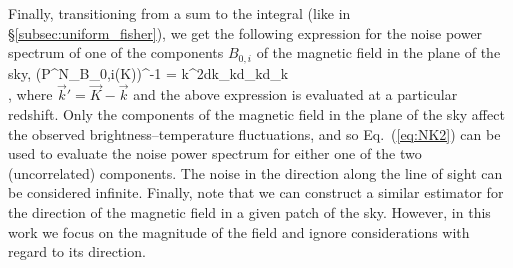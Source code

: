 Finally, transitioning from a sum to the integral (like in \S\ref{subsec:uniform_fisher}), we get the following expression for the noise power spectrum of one of the components $B_{0,i}$ of the magnetic field in the plane of the sky,
\beq
\bga
\left(P^N_{B_{0,i}}(\vec K)\right)^{-1} = \int k^2d{k}\sin \theta_kd\theta_kd\phi_k \\
\times{} ,
\ega
\label{eq:NK2}
\eeq
where $\vec k'=\vec K -\vec k$ and the above expression is evaluated at a particular redshift. Only the components of the magnetic field in the plane of the sky affect the observed brightness--temperature fluctuations, and so Eq.~(\ref{eq:NK2}) can be used to evaluate the noise power spectrum for either one of the two (uncorrelated) components. The noise in the direction along the line of sight can be considered infinite. Finally, note that we can construct a similar estimator for the direction of the magnetic field in a given patch of the sky. However, in this work we focus on the magnitude of the field and ignore considerations with regard to its direction.